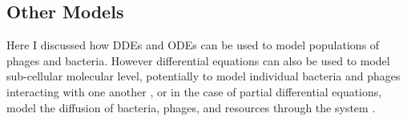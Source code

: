 \subsection{Other Models}
Here I discussed how DDEs and ODEs can be used to model populations of phages and bacteria. 
However differential equations can also be used to model sub-cellular molecular level, potentially to model individual bacteria and phages interacting with one another \cite{scottInterdependenceCellGrowth2010, mayorgaReconstructionEndosomalOrganization2018}, or in the case of partial differential equations, model the diffusion of bacteria, phages, and resources through the system \cite{kroneSpatialModelsStochastic2004, klannSpatialSimulationsSystems2012}. 
